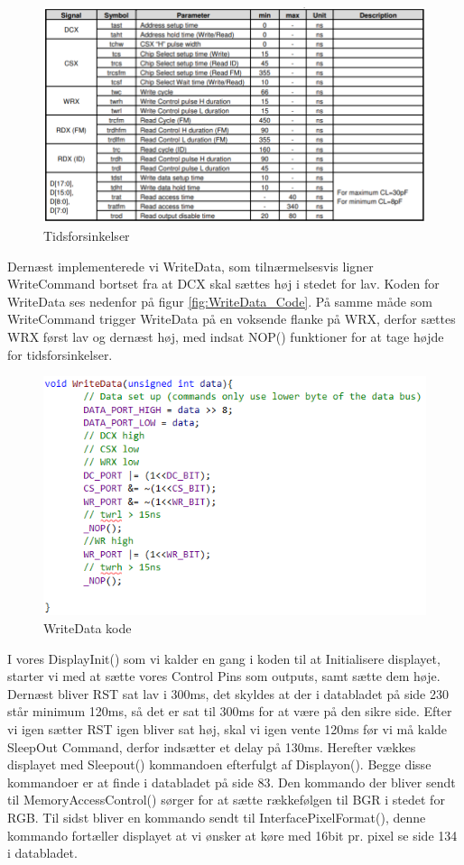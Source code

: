 \begin{figure}[H]
	\centering
	\includegraphics[width = 450pt]{Img/Timedelays.png}
	\caption{Tidsforsinkelser}
	\label{fig:Timedelays}
\end{figure}


Dernæst implementerede vi WriteData, som tilnærmelsesvis ligner WriteCommand bortset fra at DCX skal sættes høj i stedet for lav. Koden for WriteData ses nedenfor på figur \autoref{fig:WriteData_Code}. På samme måde som WriteCommand trigger WriteData på en voksende flanke på WRX, derfor sættes WRX først lav og dernæst høj, med indsat NOP() funktioner for at tage højde for tidsforsinkelser. 

\begin{figure}[H]
	\centering
	\includegraphics[width = 350pt]{Img/WriteData_Code.png}
	\caption{WriteData kode}
	\label{fig:WriteData_Code}
\end{figure}


I vores DisplayInit() som vi kalder en gang i koden til at Initialisere displayet, starter vi med at sætte vores Control Pins som outputs, samt sætte dem høje. Dernæst bliver RST sat lav i 300ms, det skyldes at der i databladet på side 230 står minimum 120ms, så det er sat til 300ms for at være på den sikre side. Efter vi igen sætter RST igen bliver sat høj, skal vi igen vente 120ms før vi må kalde SleepOut Command, derfor indsætter et delay på 130ms. Herefter vækkes displayet med Sleepout() kommandoen efterfulgt af Displayon(). Begge disse kommandoer er at finde i databladet på side 83. Den kommando der bliver sendt til MemoryAccessControl() sørger for at sætte rækkefølgen til BGR i stedet for RGB. Til sidst bliver en kommando sendt til InterfacePixelFormat(), denne kommando fortæller displayet at vi ønsker at køre med 16bit pr. pixel se side 134 i databladet. 

